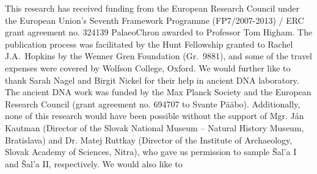 \documentclass[a4paper,10pt]{article}
\begin{document}
This research has received funding from the European Research Council under the European Union’s Seventh Framework Programme (FP7/2007-2013) / ERC grant agreement no. 324139 PalaeoChron awarded to Professor Tom Higham. The publication process was facilitated by the Hunt Fellowship granted to Rachel J.A.~Hopkins by the Wenner Gren Foundation (Gr.~9881), and some of the travel expenses were covered by Wolfson College, Oxford. We would further like to thank Sarah Nagel and Birgit Nickel for their help in ancient DNA laboratory. The ancient DNA work was funded by the Max Planck Society and the European Research Council (grant agreement no. 694707 to Svante Pääbo). Additionally, none of this research would have been possible without the support of Mgr. Ján Kautman (Director of the Slovak National Museum -- Natural History Museum, Bratislava) and Dr. Matej Ruttkay (Director of the Institute of Archaeology, Slovak Academy of Sciences, Nitra), who gave us permission to sample Šal'a I and Šal'a II, respectively. We would also like to 



 
 
\end{document}
